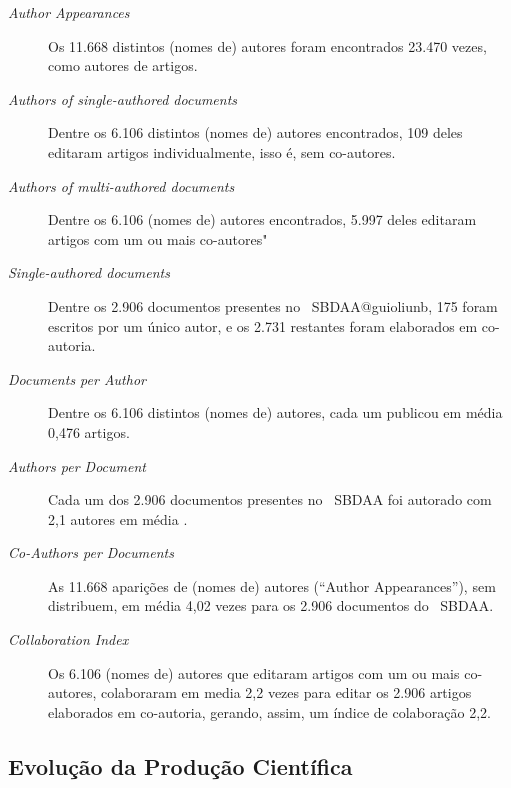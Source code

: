 \begin{description}
    \item [\textit{Author Appearances}] Os 11.668 distintos (nomes de) autores foram encontrados 23.470 vezes, como autores de artigos.
    \item [\textit{Authors of single-authored documents}] Dentre os 6.106 distintos (nomes de) autores encontrados, 109 deles editaram artigos individualmente, isso é, sem co-autores.
    \item [\textit{Authors of multi-authored documents}] Dentre os 6.106 (nomes de) autores encontrados, 5.997 deles editaram artigos com um ou mais co-autores"
    \item [\textit{Single-authored documents}] Dentre os 2.906 documentos presentes no \dataset\   SBDAA@guioliunb, 175 foram escritos por um único autor, e os 2.731 restantes foram elaborados em co-autoria.
    \item [\textit{Documents per Author}] Dentre os 6.106 distintos (nomes de) autores, cada um publicou em média 0,476 artigos.
    \item [\textit{Authors per Document}] Cada um dos 2.906 documentos presentes no \dataset\  SBDAA foi autorado com 2,1 autores em média .
    \item [\textit{Co-Authors per Documents}] As 11.668 aparições de (nomes de) autores (``Author Appearances''), sem distribuem, em média 4,02 vezes para os 2.906 documentos do \dataset\  SBDAA.
    \item [\textit{Collaboration Index}] Os 6.106 (nomes de) autores que editaram artigos com um ou mais co-autores, colaboraram em media 2,2 vezes para editar os 2.906 artigos elaborados em co-autoria, gerando, assim, um índice de colaboração 2,2. 
\end{description}

\subsection{Evolução da Produção Científica}

